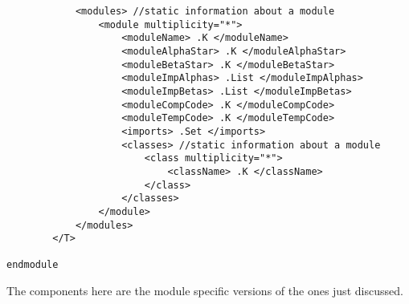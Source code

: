 \begin{lstlisting}
            <modules> //static information about a module
                <module multiplicity="*">
                    <moduleName> .K </moduleName>
                    <moduleAlphaStar> .K </moduleAlphaStar>
                    <moduleBetaStar> .K </moduleBetaStar>
                    <moduleImpAlphas> .List </moduleImpAlphas>
                    <moduleImpBetas> .List </moduleImpBetas>
                    <moduleCompCode> .K </moduleCompCode>
                    <moduleTempCode> .K </moduleTempCode>
                    <imports> .Set </imports>
                    <classes> //static information about a module
                        <class multiplicity="*">
                            <className> .K </className>
                        </class>
                    </classes>
                </module>
            </modules>
        </T>

endmodule
\end{lstlisting}

The components here are the module specific versions of the ones just discussed.